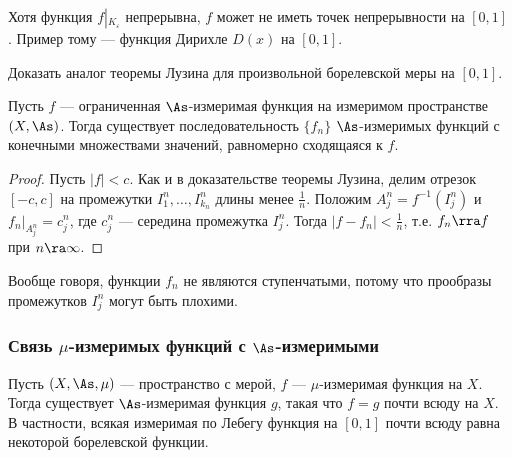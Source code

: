 \documentclass[10pt]{article}
\newcommand{\ve}{\varepsilon}
\begin{document}
\begin{note}
Хотя функция $f\left|_{K_\ve}\right.$ непрерывна, $f$ может не иметь
точек непрерывности на $[0,1]$. Пример тому --- функция Дирихле
$D(x)$ на $[0,1]$.
\end{note}


\begin{problem}
Доказать аналог теоремы Лузина для произвольной борелевской меры на
$[0,1]$.
\end{problem}



\begin{imp}\label{bounded_function}
Пусть $f$ --- ограниченная $\As$-измеримая функция на измеримом
пространстве $(X,\As)$. Тогда существует последовательность
$\{f_n\}$ $\As$-измеримых функций с конечными множествами значений,
равномерно сходящаяся к $f$.
\end{imp}

\begin{proof}
Пусть $|f|<c$. Как и в доказательстве теоремы Лузина, делим отрезок
$[-c,c]$ на промежутки $I_1^n,\ldots, I_{k_n}^n$ длины менее
$\frac1n$. Положим $A_j^n=f^{-1}(I_j^n)$ и
$\left.f_n\right|_{A_j^n}=c_j^n$, где $c_j^n$ --- середина
промежутка $I_j^n$. Тогда $|f-f_n|<\frac1n$, т.е. $f_n\rra f$ при
$n\ra\infty$.
\end{proof}

\begin{note}
Вообще говоря, функции $f_n$ не являются ступенчатыми, потому что
прообразы промежутков $I_j^n$ могут быть плохими.
\end{note}

\subsubsection{Связь $\mu$-измеримых функций с $\As$-измеримыми}

\begin{prop}\label{A_mu_measurable}
Пусть $(X,\As,\mu)$ --- пространство с мерой, $f$ ---
$\mu$-измеримая функция на $X$. Тогда существует $\As$-измеримая
функция $g$, такая что $f=g$ почти всюду на $X$. В частности, всякая
измеримая по Лебегу функция на $[0,1]$ почти всюду равна некоторой
борелевской функции.
\end{prop}
\end{document}
